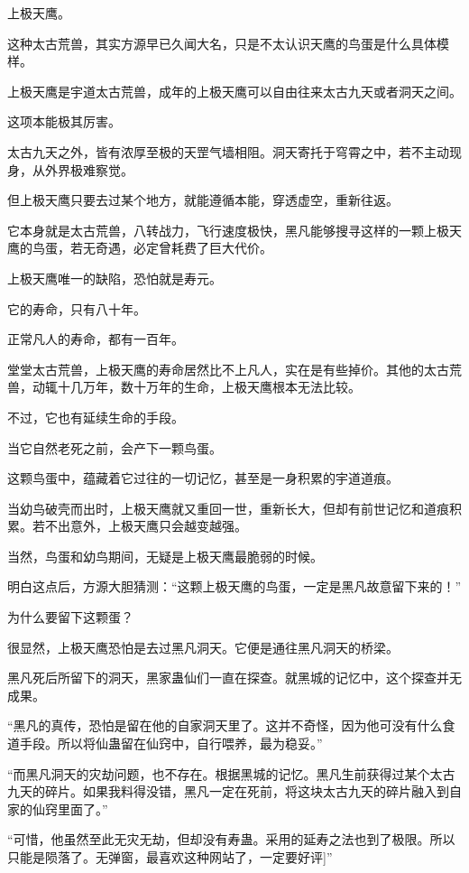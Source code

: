 
\begin{this_body}

上极天鹰。

这种太古荒兽，其实方源早已久闻大名，只是不太认识天鹰的鸟蛋是什么具体模样。

上极天鹰是宇道太古荒兽，成年的上极天鹰可以自由往来太古九天或者洞天之间。

这项本能极其厉害。

太古九天之外，皆有浓厚至极的天罡气墙相阻。洞天寄托于穹霄之中，若不主动现身，从外界极难察觉。

但上极天鹰只要去过某个地方，就能遵循本能，穿透虚空，重新往返。

它本身就是太古荒兽，八转战力，飞行速度极快，黑凡能够搜寻这样的一颗上极天鹰的鸟蛋，若无奇遇，必定曾耗费了巨大代价。

上极天鹰唯一的缺陷，恐怕就是寿元。

它的寿命，只有八十年。

正常凡人的寿命，都有一百年。

堂堂太古荒兽，上极天鹰的寿命居然比不上凡人，实在是有些掉价。其他的太古荒兽，动辄十几万年，数十万年的生命，上极天鹰根本无法比较。

不过，它也有延续生命的手段。

当它自然老死之前，会产下一颗鸟蛋。

这颗鸟蛋中，蕴藏着它过往的一切记忆，甚至是一身积累的宇道道痕。

当幼鸟破壳而出时，上极天鹰就又重回一世，重新长大，但却有前世记忆和道痕积累。若不出意外，上极天鹰只会越变越强。

当然，鸟蛋和幼鸟期间，无疑是上极天鹰最脆弱的时候。

明白这点后，方源大胆猜测：“这颗上极天鹰的鸟蛋，一定是黑凡故意留下来的！”

为什么要留下这颗蛋？

很显然，上极天鹰恐怕是去过黑凡洞天。它便是通往黑凡洞天的桥梁。

黑凡死后所留下的洞天，黑家蛊仙们一直在探查。就黑城的记忆中，这个探查并无成果。

“黑凡的真传，恐怕是留在他的自家洞天里了。这并不奇怪，因为他可没有什么食道手段。所以将仙蛊留在仙窍中，自行喂养，最为稳妥。”

“而黑凡洞天的灾劫问题，也不存在。根据黑城的记忆。黑凡生前获得过某个太古九天的碎片。如果我料得没错，黑凡一定在死前，将这块太古九天的碎片融入到自家的仙窍里面了。”

“可惜，他虽然至此无灾无劫，但却没有寿蛊。采用的延寿之法也到了极限。所以只能是陨落了。无弹窗，最喜欢这种网站了，一定要好评]”


\end{this_body}
